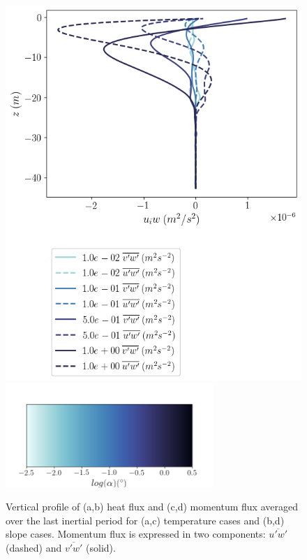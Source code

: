 \begin{figure}
\begin{minipage}{0.5\textwidth}
        \includegraphics[trim={0 7.5cm 0 0},clip,width=\textwidth]{Figures/momflux_cmp_dslope_46h_tav12_z_profile.png}
        \centering \includegraphics[width=0.7\textwidth,trim={1cm 0cm 1cm 5cm}, clip]{Figures/colorbar_slope.png}
    \end{minipage}
    \caption{Vertical profile of (a,b) heat flux and (c,d) momentum flux averaged over the last inertial period for (a,c) temperature cases and (b,d) slope cases. Momentum flux is expressed in two components:  $\overline{u'w'}$ (dashed) and $\overline{v'w'}$ (solid).} %
    \label{fig:flux_profiles}
\end{figure}

